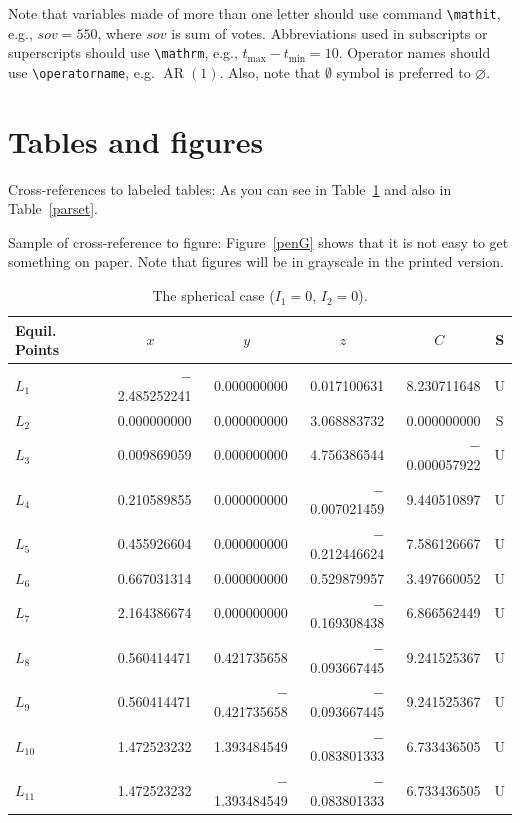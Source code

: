 \documentclass[qe,nameyear,final,openaccess]{econsocart}
\theoremstyle{plain}
\begin{document}
Note that variables made of more than one letter should use command \texttt{{\textbackslash}mathit},
e.g., $\mathit{sov}=550$, where $\mathit{sov}$ is sum of votes. Abbreviations used in subscripts or superscripts should use \texttt{{\textbackslash}mathrm},
e.g., $t_{\mathrm{max}} -t_{\mathrm{min}} =10$. Operator names should use \texttt{{\textbackslash}operatorname}, e.g. $\operatorname{AR}(1)$. Also, note that $\emptyset$ symbol is preferred to $\varnothing$.

\section{Tables and figures}

Cross-references to labeled tables: As you can see in Table~\ref{sphericcase}
and also in Table~\ref{parset}.

Sample of cross-reference to figure: Figure~\ref{penG} shows that it is not easy to get something on paper. Note that figures will be in grayscale in the printed version.


\begin{table}
\caption{The spherical case ($I_1=0$, $I_2=0$).}
\label{sphericcase}
\begin{tabular}{@{}lrrrrc@{}@{}}
\hline
Equil. Points
& \multicolumn{1}{c}{$x$}
& \multicolumn{1}{c}{$y$}
& \multicolumn{1}{c}{$z$}
& \multicolumn{1}{c}{$C$}
& S \\
\hline
$L_1$    & $-$2.485252241 & 0.000000000    & 0.017100631    & 8.230711648    & U \\
$L_2$    & 0.000000000    & 0.000000000    & 3.068883732    & 0.000000000    & S \\
$L_3$    & 0.009869059    & 0.000000000    & 4.756386544    & $-$0.000057922 & U \\
$L_4$    & 0.210589855    & 0.000000000    & $-$0.007021459 & 9.440510897    & U \\
$L_5$    & 0.455926604    & 0.000000000    & $-$0.212446624 & 7.586126667    & U \\
$L_6$    & 0.667031314    & 0.000000000    & 0.529879957    & 3.497660052    & U \\
$L_7$    & 2.164386674    & 0.000000000    & $-$0.169308438 & 6.866562449    & U \\
$L_8$    & 0.560414471    & 0.421735658    & $-$0.093667445 & 9.241525367    & U \\
$L_9$    & 0.560414471    & $-$0.421735658 & $-$0.093667445 & 9.241525367    & U \\
$L_{10}$ & 1.472523232    & 1.393484549    & $-$0.083801333 & 6.733436505    & U \\
$L_{11}$ & 1.472523232    & $-$1.393484549 & $-$0.083801333 & 6.733436505    & U \\
\hline
\end{tabular}

\end{table}
\end{document}
